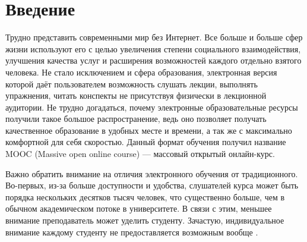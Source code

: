 \documentclass{matmex-diploma-custom}
\begin{document}
\maketitle
\tableofcontents
\section*{Введение}

Трудно представить современными мир без Интернет. Все больше и больше
сфер жизни используют его с целью увеличения степени социального
взаимодействия, улучшения качества услуг и расширения возможностей
каждого отдельно взятого человека.  Не стало исключением и сфера
образования, электронная версия которой даёт пользователем возможность
слушать лекции, выполнять упражнения, читать конспекты не присутствуя
физически в лекционной аудитории. Не трудно догадаться, почему
электронные образовательные ресурсы получили такое большое
распространение, ведь оно позволяет получать качественное образование
в удобных месте и времени, а так же с максимально комфортной для себя
скоростью. Данный формат обучения получил название MOOC (Massive open
online course) --- массовый открытый онлайн-курс.

Важно обратить внимание на отличия электронного обучения от
традиционного. Во-первых, из-за больше доступности и удобства,
слушателей курса может быть порядка нескольких десятков тысяч человек,
что существенно больше, чем в обычном академическом потоке в
университете. В связи с этим, меньшее внимание преподаватель может
уделить студенту. Зачастую, индивидуальное внимание каждому студенту
не предоставляется возможным вообще \cite{breslow2013studying}.
\end{document}
